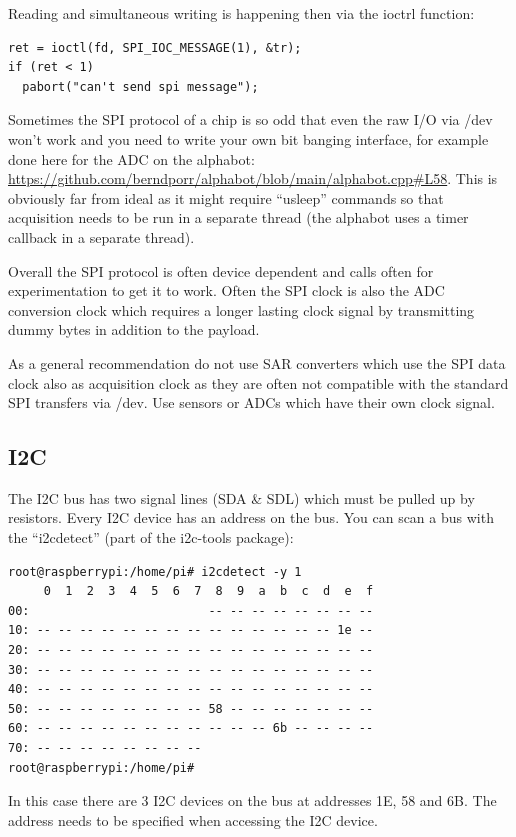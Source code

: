 \documentclass[12pt]{report}
\begin{document}
Reading and simultaneous writing is happening then via the ioctrl
function:
\begin{verbatim}
ret = ioctl(fd, SPI_IOC_MESSAGE(1), &tr);
if (ret < 1)
  pabort("can't send spi message");	  
\end{verbatim}

Sometimes the SPI protocol of a chip is so odd that even the raw
I/O via /dev won't work and you need to write your own bit banging
interface, for example done here for the ADC on the alphabot:
\url{https://github.com/berndporr/alphabot/blob/main/alphabot.cpp#L58}.
This is obviously far from ideal as it might require ``usleep'' commands
so that acquisition needs to be run in a separate thread (the alphabot
uses a timer callback in a separate thread).

Overall the SPI protocol is often device dependent and calls often
for experimentation to get it to work. Often the SPI clock is also
the ADC conversion clock which requires a longer lasting clock signal
by transmitting dummy bytes in addition to the payload.

As a general recommendation do not use SAR converters which use the
SPI data clock also as acquisition clock as they are often not compatible
with the standard SPI transfers via /dev. Use sensors or ADCs which
have their own clock signal.


\subsection{I2C}
The I2C bus has two signal lines (SDA \& SDL) which must be pulled up
by resistors. Every I2C device has an address on the bus. You can scan
a bus with the ``i2cdetect'' (part of the i2c-tools package):
\begin{verbatim}
root@raspberrypi:/home/pi# i2cdetect -y 1
     0  1  2  3  4  5  6  7  8  9  a  b  c  d  e  f
00:                         -- -- -- -- -- -- -- -- 
10: -- -- -- -- -- -- -- -- -- -- -- -- -- -- 1e -- 
20: -- -- -- -- -- -- -- -- -- -- -- -- -- -- -- -- 
30: -- -- -- -- -- -- -- -- -- -- -- -- -- -- -- -- 
40: -- -- -- -- -- -- -- -- -- -- -- -- -- -- -- -- 
50: -- -- -- -- -- -- -- -- 58 -- -- -- -- -- -- -- 
60: -- -- -- -- -- -- -- -- -- -- -- 6b -- -- -- -- 
70: -- -- -- -- -- -- -- --                         
root@raspberrypi:/home/pi# 
\end{verbatim}
In this case there are 3 I2C devices on the bus at addresses
1E, 58 and 6B. The address needs to be specified when
accessing the I2C device.
\end{document}
